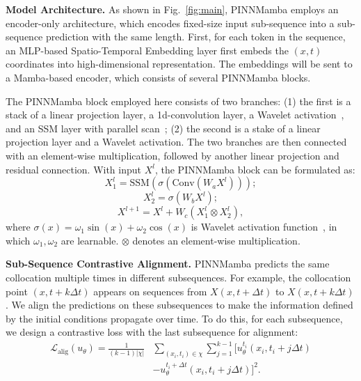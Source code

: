 \documentclass{article}
\theoremstyle{plain}
\theoremstyle{definition}
\theoremstyle{remark}
\begin{document}
\textbf{Model Architecture.} As shown in Fig.~\ref{fig:main}, PINNMamba employs an encoder-only architecture, which encodes fixed-size input sub-sequence into a sub-sequence prediction with the same length. First, for each token in the sequence, an MLP-based Spatio-Temporal Embedding layer first embeds the $(x,t)$ coordinates into high-dimensional representation. The embeddings will be sent to a Mamba-based encoder, which consists of several PINNMamba blocks. 

The PINNMamba block employed here consists of two branches: (1) the first is a stack of a linear projection layer, a 1d-convolution layer, a Wavelet activation~\cite{zhao2024pinnsformer}, and an SSM layer with parallel scan~\cite{gu2023mamba}; (2) the second is a stake of a linear projection layer and a Wavelet activation. The two branches are then connected with an element-wise multiplication, followed by another linear projection and residual connection. With input $X^l$,
the PINNMamba block can be formulated as: 
\begin{equation}
    X_1^l = \text{SSM}(\sigma(\text{Conv}(W_aX^l)));
\end{equation}
\vspace{-5mm}
\begin{equation}
    X_2^l = \sigma(W_bX^l);
\end{equation}
\vspace{-5mm}
\begin{equation}
    X^{l+1} = X^l+W_c(X_1^l\otimes X_2^l),
\end{equation}
where $\sigma(x)=\omega_1\sin(x)+\omega_2\cos(x)$ is Wavelet activation function~\cite{zhao2024pinnsformer}, in which $\omega_1,\omega_2$ are learnable. $\otimes$ denotes an element-wise multiplication. 

\textbf{Sub-Sequence Contrastive Alignment.} PINNMamba predicts the same collocation multiple times in different subsequences. For example, the collocation point $(x,t+k\Delta t)$ appears on sequences from $X(x,t+\Delta t)$ to $X(x,t+k\Delta t)$. We align the predictions on these subsequences to make the information defined by the initial conditions propagate over time. To do this, for each subsequence, we design a contrastive loss with the last subsequence for alignment:
\begin{align}
        \mathcal L_\text{alig}(u_\theta)= \frac{1}{(k-1)|\chi|}&\sum_{(x_i,t_i)\in \chi} \sum_{j=1}^{k-1} \Big[u_\theta^{t_i}(x_i,t_i+j\Delta t)\nonumber\\&-u_\theta^{t_i+\Delta t}(x_i,t_i+j\Delta t)\Big]^2.
\end{align}
\normalsize
\end{document}
